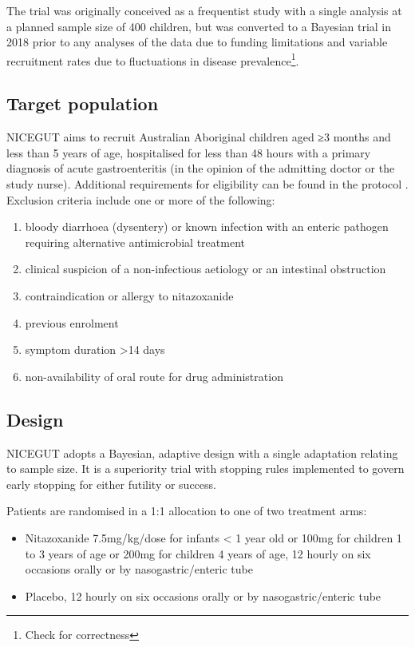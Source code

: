 \documentclass[a4paper]{article}
\begin{document}
The trial was originally conceived as a frequentist study with a single analysis at a planned sample size of 400 children, but was converted to a Bayesian trial in 2018 prior to any analyses of the data due to funding limitations and variable recruitment rates due to fluctuations in disease prevalence\footnote{Check for correctness}.

\subsection{Target population}

NICEGUT aims to recruit Australian Aboriginal children aged ≥3 months and less than 5 years of age, hospitalised for less than 48 hours with a primary diagnosis of acute gastroenteritis (in the opinion of the admitting doctor or the study nurse).
Additional requirements for eligibility can be found in the protocol \cite{Waddingtone019632}.
Exclusion criteria include one or more of the following:
\begin{enumerate}
    \item bloody diarrhoea (dysentery) or known infection with an enteric pathogen requiring alternative antimicrobial treatment
    \item clinical suspicion of a non-infectious aetiology or an intestinal obstruction
    \item contraindication or allergy to nitazoxanide
    \item previous enrolment
    \item symptom duration >14 days
    \item non-availability of oral route for drug administration
\end{enumerate}

\subsection{Design}

NICEGUT adopts a Bayesian, adaptive design with a single adaptation relating to sample size.
It is a superiority trial with stopping rules implemented to govern early stopping for either futility or  success. 

Patients are randomised in a 1:1 allocation to one of two treatment arms: 

\begin{itemize}
    \item Nitazoxanide 7.5mg/kg/dose for infants < 1 year old or 100mg for children 1 to 3 years of age or 200mg for children 4 years of age, 12 hourly on six occasions orally or by nasogastric/enteric tube
    \item Placebo, 12 hourly on six occasions orally or by nasogastric/enteric tube
\end{itemize}
\end{document}
